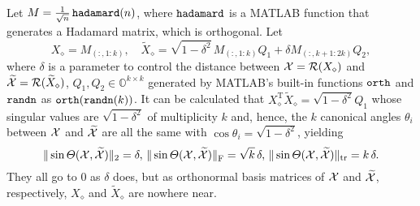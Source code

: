 \documentclass[11pt]{article}
\def\bbO{\mathbb{O}}
\def\cR{{\cal R}}
\def\cX{{\cal X}}
\DeclareMathOperator{\tr}{tr}
\DeclareMathOperator{\F}{F}
\DeclareMathOperator{\T}{T}
\def\wtd{\widetilde}
\def\hadm{{\tt hadamard}}
\def\randn{{\tt randn}}
\def\orth{{\tt orth}}
\theoremstyle{definition}
\newtheorem{example}{Example}[section]
\numberwithin{equation}{section}
\numberwithin{figure}{section}
\numberwithin{table}{section}
\begin{document}
Let $M=\frac 1{\sqrt n}\,\hadm(n)$, where $\hadm$ is a  MATLAB function that generates a Hadamard matrix, which
is orthogonal. Let
$$
X_{\diamond}=M_{ (:,1:k)},\quad
\wtd X_{\diamond}=\sqrt{1-\delta^2}\,M_{(:,1:k)}Q_1+\delta M_{(:,k+1:2k)}Q_2,
$$
where $\delta$ is a parameter to control the distance between $\cX=\cR(X_{\diamond})$
and $\wtd\cX=\cR(\wtd X_{\diamond})$, $Q_1, Q_2\in\bbO^{k\times k}$ generated by
MATLAB's built-in functions $\orth$ and $\randn$ as $\orth(\randn(k))$. It can be calculated that
$X_{\diamond}^{\T}\wtd X_{\diamond}=\sqrt{1-\delta^2} Q_1$ whose singular values are
$\sqrt{1-\delta^2}$ of multiplicity $k$ and, hence,  the $k$ canonical angles $\theta_i$
between $\cX$ and $\wtd\cX$ are all the same with $\cos\theta_i=\sqrt{1-\delta^2}$, yielding
\begin{equation}\label{eq:sin-value}
\|\sin\Theta(\cX,\wtd\cX)\|_2=\delta,\,
\|\sin\Theta(\cX,\wtd\cX)\|_{\F}=\sqrt k\,\delta,\,
\|\sin\Theta(\cX,\wtd\cX)\|_{\tr}= k\,\delta.
\end{equation}
They all go to $0$ as $\delta$ does, but as orthonormal basis matrices of $\cX$ and $\wtd\cX$,
respectively, $X_{\diamond}$ and $\wtd X_{\diamond}$ are nowhere near.
\end{document}
